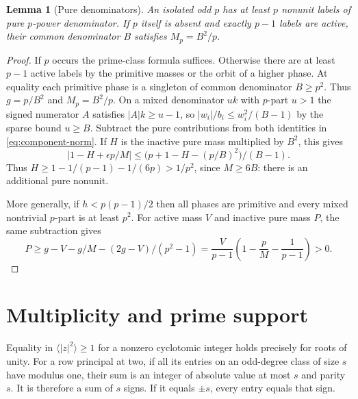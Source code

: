 \documentclass[11pt]{amsart}
\numberwithin{equation}{section}
\newtheorem{lemma}[theorem]{Lemma}
\theoremstyle{definition}
\theoremstyle{plain}
\begin{document}
\begin{lemma}[Pure denominators]
An isolated odd $p$ has at least $p$ nonunit labels of pure $p$-power
denominator. If $p$ itself is absent and exactly $p-1$ labels are
active, their common denominator $B$ satisfies $M_p=B^2/p$.
\end{lemma}
\begin{proof}
If $p$ occurs the prime-class formula suffices. Otherwise there are
at least $p-1$ active labels by the primitive masses or the orbit of
a higher phase. At equality each primitive phase is a singleton of
common denominator $B\ge p^2$. Thus $g=p/B^2$ and $M_p=B^2/p$.
On a mixed denominator $uk$ with $p$-part $u>1$ the signed numerator
$A$ satisfies $|A|k\ge u-1$, so $|w_i|/b_i\le w_i^2/(B-1)$ by
the sparse bound $u\ge B$. Subtract the pure contributions from both
identities in \eqref{eq:component-norm}. If $H$ is the inactive pure
mass multiplied by $B^2$, this gives
\begin{equation}\label{eq:packet-shell}
 |1-H+\epsilon p/M|\le\bigl(p+1-H-(p/B)^2\bigr)/(B-1).
\end{equation}
Thus $H\ge1-1/(p-1)-1/(6p)>1/p^2$, since $M\ge6B$:
there is an additional pure nonunit.

More generally, if $h<p(p-1)/2$ then all phases are primitive and
every mixed nontrivial $p$-part is at least $p^2$. For active mass
$V$ and inactive pure mass $P$, the same subtraction gives
\[
 P\ge g-V-g/M-(2g-V)/(p^2-1)
   =\frac{V}{p-1}\left(1-\frac pM-\frac1{p-1}\right)>0.
\]
\end{proof}

\section{Multiplicity and prime support}
Equality in $\langle |z|^2\rangle\ge1$ for a nonzero cyclotomic integer
holds precisely for roots of unity. For a row principal at two, if all its entries on an odd-degree
class of size $s$ have modulus one, their sum is an integer of absolute value
at most $s$ and parity $s$. It is therefore a sum of $s$ signs. If it
equals $\pm s$, every entry equals that sign.
\end{document}
